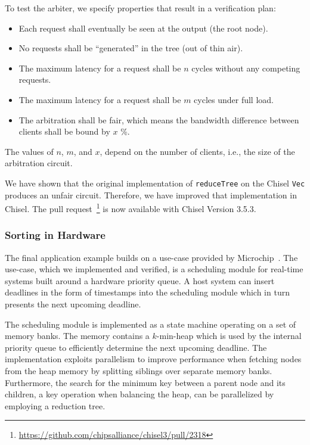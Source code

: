\documentclass[conference]{IEEEtran}
\newcommand{\code}[1]{{\small{\texttt{#1}}}}
\newcommand{\martin}[1]{{\color{blue} Martin: #1}}
\begin{document}
To test the arbiter, we specify properties that result in a verification plan:

\begin{itemize}
\item Each request shall eventually be seen at the output (the root node).
\item No requests shall be ``generated'' in the tree (out of thin air).
\item The maximum latency for a request shall be $n$ cycles without any competing requests.
\item The maximum latency for a request shall be $m$ cycles under full load.
\item The arbitration shall be fair, which means the bandwidth difference between clients shall be bound by $x$ \%.
\end{itemize}

The values of $n$, $m$, and $x$, depend on the number of clients, i.e., the size of the arbitration
circuit.

We have shown that the original implementation of \code{reduceTree} on the Chisel \code{Vec}
produces an unfair circuit. Therefore, we have improved that implementation in Chisel.
The pull request~\footnote{\url{https://github.com/chipsalliance/chisel3/pull/2318}} is now available
with Chisel Version 3.5.3.

\subsubsection{Sorting in Hardware}


The final application example builds on a use-case provided
by Microchip~\cite{microchip}. The use-case, which we implemented and verified, is a scheduling module for real-time systems built around a hardware priority queue.
A host system can insert deadlines in the form of timestamps into the scheduling module which in turn presents the next upcoming deadline.

The scheduling module is implemented as a state machine 
operating on a set of memory banks. The memory contains a $k$-min-heap which is used by the internal priority queue to efficiently determine the next upcoming deadline. The implementation exploits parallelism to improve performance when fetching nodes from the heap memory by splitting siblings over separate memory banks. Furthermore, the search for the minimum key between a parent node and its children, a key operation when balancing the heap, can be parallelized by employing a reduction tree.
\end{document}
